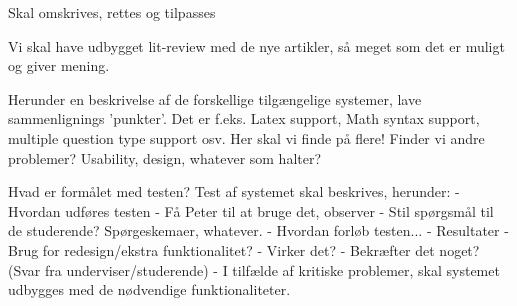 Skal omskrives, rettes og tilpasses

Vi skal have udbygget lit-review med de nye artikler, så meget som det er muligt og giver mening.

Herunder en beskrivelse af de forskellige tilgængelige systemer, lave sammenlignings 'punkter'. Det er f.eks. Latex support, Math syntax support, multiple question type support osv. Her skal vi finde på flere!
Finder vi andre problemer? Usability, design, whatever som halter?

Hvad er formålet med testen?
Test af systemet skal beskrives, herunder:
    - Hvordan udføres testen
        - Få Peter til at bruge det, observer
        - Stil spørgsmål til de studerende? Spørgeskemaer, whatever.
    - Hvordan forløb testen...
    - Resultater
        - Brug for redesign/ekstra funktionalitet?
        - Virker det?
        - Bekræfter det noget? (Svar fra underviser/studerende)
    -
I tilfælde af kritiske problemer, skal systemet udbygges med de nødvendige funktionaliteter.